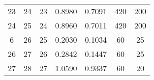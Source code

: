 \begin{table}[]
\begin{adjustbox}{width=1.1\textwidth,center=\textwidth}
\begin{tabular}{@{}ccccccc@{}}
23                                                             & 24                                                             & 23                                                   & 0.8980                                                                         & 0.7091                                                                         & 420                                                                              & 200                                                                                  \\
24                                                             & 25                                                             & 24                                                   & 0.8960                                                                         & 0.7011                                                                         & 420                                                                              & 200                                                                                  \\
6                                                              & 26                                                             & 25                                                   & 0.2030                                                                         & 0.1034                                                                         & 60                                                                               & 25                                                                                   \\
26                                                             & 27                                                             & 26                                                   & 0.2842                                                                         & 0.1447                                                                         & 60                                                                               & 25                                                                                   \\
27                                                             & 28                                                             & 27                                                   & 1.0590                                                                         & 0.9337                                                                         & 60                                                                               & 20                                                                                   \\

\end{tabular}
\end{adjustbox}
\end{table}
